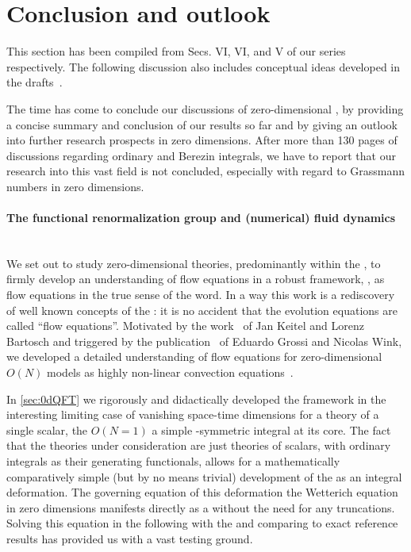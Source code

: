 \section{Conclusion and outlook}\label{sec:0dconclusion}
\begin{disclaimer}
	This section has been compiled from Secs. VI, VI, and V of our series~\cite{zerod1,zerod2,zerod3} respectively.
	The following discussion also includes conceptual ideas developed in the drafts~\cite{zerod4,Koenigstein:fixedPoint}.
\end{disclaimer}
The time has come to conclude our discussions of zero-dimensional \qfts{}, by providing a concise summary and conclusion of our results so far and by giving an outlook into further research prospects in zero dimensions.
After more than 130 pages of discussions regarding ordinary and Berezin integrals, we have to report that our research into this vast field is not concluded, especially with regard to Grassmann numbers in zero dimensions.

\paragraph{The functional renormalization group and (numerical) fluid dynamics}\label{paragraph:0dconclusionCDF}\mbox{}\\%
We set out to study zero-dimensional theories, predominantly within the \frg{}, to firmly develop an understanding of \frg{} flow equations in a robust \cfd{} framework, \ie{}, as flow equations in the true sense of the word.
In a way this work is a rediscovery of well known concepts of the \grg{}: it is no accident that the evolution equations are called ``flow equations''.
Motivated by the work~\cite{Keitel:2011pn} of Jan Keitel and Lorenz Bartosch and triggered by the publication~\cite{Grossi:2021ksl} of Eduardo Grossi and Nicolas Wink, we developed a detailed understanding of \frg{} flow equations for zero-dimensional $O(N)$ models as highly non-linear convection equations~\cite{zerod1,zerod2,zerod3}.\bigskip

In \cref{sec:0dQFT} we rigorously and didactically developed the \frg{} framework in the interesting limiting case of vanishing space-time dimensions for a theory of a single scalar, \viz{} the $O(N=1)$ a simple \ZII{}-symmetric integral at its core.
The fact that the theories under consideration are just theories of scalars, with ordinary integrals as their generating functionals, allows for a mathematically comparatively simple (but by no means trivial) development of the \frg{} as an integral deformation.
The governing equation of this deformation \dash{} the Wetterich equation in zero dimensions \dash{} manifests directly as a \pde{} without the need for any truncations.
Solving this equation in the following with the \frg{} and comparing to exact reference results has provided us with a vast testing ground.

